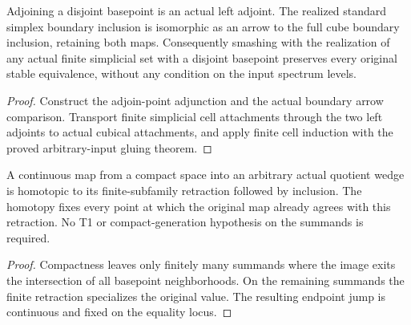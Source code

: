\begin{proposition}
  \label{prop:actual-finite-simplicial-realization-flatness}
  \leanok
  Adjoining a disjoint basepoint is an actual left adjoint. The realized standard simplex boundary inclusion is isomorphic as an arrow to the full cube boundary inclusion, retaining both maps. Consequently smashing with the realization of any actual finite simplicial set with a disjoint basepoint preserves every original stable equivalence, without any condition on the input spectrum levels.
\end{proposition}
\begin{proof}
  Construct the adjoin-point adjunction and the actual boundary arrow comparison. Transport finite simplicial cell attachments through the two left adjoints to actual cubical attachments, and apply finite cell induction with the proved arbitrary-input gluing theorem.
  \leanok
\end{proof}

\begin{proposition}
  \label{prop:actual-wedge-homotopy-finite-support}
  \leanok
  A continuous map from a compact space into an arbitrary actual quotient wedge is homotopic to its finite-subfamily retraction followed by inclusion. The homotopy fixes every point at which the original map already agrees with this retraction. No T1 or compact-generation hypothesis on the summands is required.
\end{proposition}
\begin{proof}
  Compactness leaves only finitely many summands where the image exits the intersection of all basepoint neighborhoods. On the remaining summands the finite retraction specializes the original value. The resulting endpoint jump is continuous and fixed on the equality locus.
  \leanok
\end{proof}

